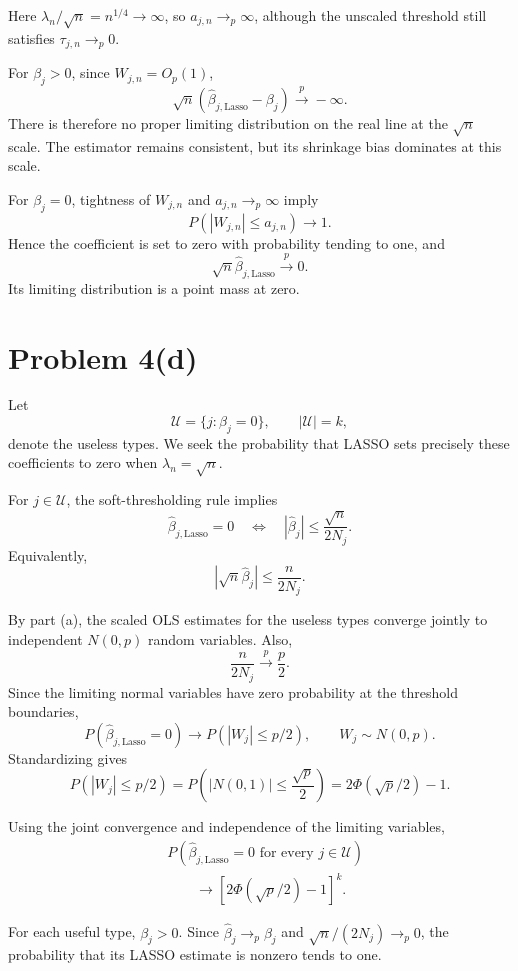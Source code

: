 \documentclass[11pt]{article}
\begin{document}
Here $\lambda_n/\sqrt{n}=n^{1/4}\to\infty$,
so $a_{j,n}\to_p\infty$, although the
unscaled threshold still satisfies
$\tau_{j,n}\to_p0$.

For $\beta_j>0$, since $W_{j,n}=O_p(1)$,
\[
\boxed{
\sqrt{n}
(\widehat{\beta}_{j,\mathrm{Lasso}}-\beta_j)
\xrightarrow{p}-\infty.
}
\]
There is therefore no proper limiting
distribution on the real line at the
$\sqrt{n}$ scale. The estimator remains
consistent, but its shrinkage bias dominates
at this scale.

For $\beta_j=0$, tightness of $W_{j,n}$ and
$a_{j,n}\to_p\infty$ imply
\[
P(|W_{j,n}|\leq a_{j,n})\to1.
\]
Hence the coefficient is set to zero with
probability tending to one, and
\[
\boxed{
\sqrt{n}\widehat{\beta}_{j,\mathrm{Lasso}}
\xrightarrow{p}0.
}
\]
Its limiting distribution is a point mass at zero.
\section*{Problem 4(d)}

Let
\[
\mathcal{U}=\{j:\beta_j=0\},
\qquad |\mathcal{U}|=k,
\]
denote the useless types. We seek the probability
that LASSO sets precisely these coefficients
to zero when $\lambda_n=\sqrt{n}$.

For $j\in\mathcal{U}$, the soft-thresholding
rule implies
\[
\widehat{\beta}_{j,\mathrm{Lasso}}=0
\quad\Longleftrightarrow\quad
|\widehat{\beta}_j|
\leq\frac{\sqrt{n}}{2N_j}.
\]
Equivalently,
\[
|\sqrt{n}\widehat{\beta}_j|
\leq\frac{n}{2N_j}.
\]

By part (a), the scaled OLS estimates for
the useless types converge jointly to
independent $N(0,p)$ random variables.
Also,
\[
\frac{n}{2N_j}\xrightarrow{p}\frac{p}{2}.
\]
Since the limiting normal variables have
zero probability at the threshold boundaries,
\[
P(\widehat{\beta}_{j,\mathrm{Lasso}}=0)
\longrightarrow
P(|W_j|\leq p/2),
\qquad W_j\sim N(0,p).
\]
Standardizing gives
\[
P(|W_j|\leq p/2)
=
P\left(|N(0,1)|\leq\frac{\sqrt{p}}{2}\right)
=
2\Phi(\sqrt{p}/2)-1.
\]

Using the joint convergence and independence
of the limiting variables,
\[
\begin{aligned}
&P\left(
\widehat{\beta}_{j,\mathrm{Lasso}}=0
\text{ for every }j\in\mathcal{U}
\right)\\
&\qquad\longrightarrow
\left[2\Phi(\sqrt{p}/2)-1\right]^k.
\end{aligned}
\]

For each useful type, $\beta_j>0$.
Since $\widehat{\beta}_j\to_p\beta_j$ and
$\sqrt{n}/(2N_j)\to_p0$, the probability
that its LASSO estimate is nonzero tends to one.
\end{document}
